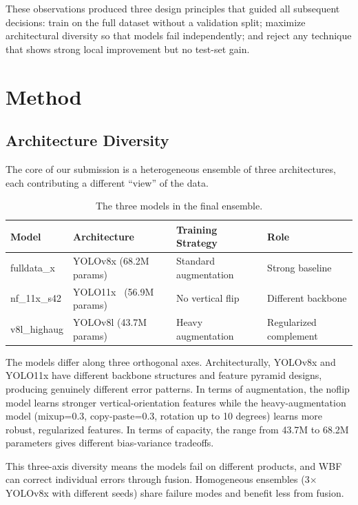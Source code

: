 \documentclass[11pt,a4paper]{article}
\begin{document}
These observations produced three design principles that guided all subsequent decisions: train on the full dataset without a validation split; maximize architectural diversity so that models fail independently; and reject any technique that shows strong local improvement but no test-set gain.

\section{Method}
\label{sec:method}

\subsection{Architecture Diversity}
\label{sec:diversity}

The core of our submission is a heterogeneous ensemble of three architectures, each contributing a different ``view'' of the data.

\begin{table}[H]
\centering
\caption{The three models in the final ensemble.}
\label{tab:models}
\begin{tabular}{@{}llll@{}}
\toprule
\textbf{Model} & \textbf{Architecture} & \textbf{Training Strategy} & \textbf{Role} \\
\midrule
fulldata\_x & YOLOv8x (68.2M params) & Standard augmentation & Strong baseline \\
nf\_11x\_s42 & YOLO11x~\cite{ultralytics2024yolo11} (56.9M params) & No vertical flip & Different backbone \\
v8l\_highaug & YOLOv8l (43.7M params) & Heavy augmentation & Regularized complement \\
\bottomrule
\end{tabular}
\end{table}

The models differ along three orthogonal axes.
Architecturally, YOLOv8x and YOLO11x have different backbone structures and feature pyramid designs, producing genuinely different error patterns.
In terms of augmentation, the noflip model learns stronger vertical-orientation features while the heavy-augmentation model (mixup=0.3, copy-paste=0.3, rotation up to 10 degrees) learns more robust, regularized features.
In terms of capacity, the range from 43.7M to 68.2M parameters gives different bias-variance tradeoffs.

This three-axis diversity means the models fail on different products, and WBF can correct individual errors through fusion.
Homogeneous ensembles (3$\times$YOLOv8x with different seeds) share failure modes and benefit less from fusion.
\end{document}
